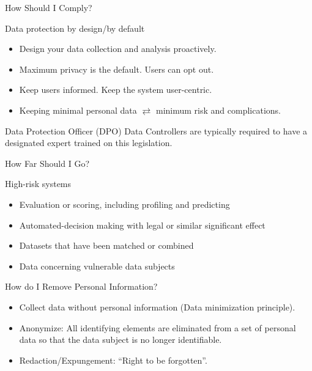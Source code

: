 \documentclass[24pt]{beamer}
\begin{document}
\begin{frame}{How Should I Comply?}
	\begin{block}{Data protection by design/by default}
		\begin{itemize}
			\item Design your data collection and analysis \alert{proactively}.
			\item Maximum privacy is the default. Users can opt out.
			\item Keep users informed. Keep the system user-centric.
			\item Keeping \alert{minimal personal data} $\rightleftarrows$ minimum risk and complications.
		\end{itemize}
	\end{block}
	
	\begin{block}{Data Protection Officer (DPO)}
		Data Controllers are typically required to have a \alert{designated expert} trained on this legislation.
	\end{block}
\end{frame}

\begin{frame}{How Far Should I Go?}
	\begin{alertblock}{High-risk systems}
		\begin{itemize}
			\item Evaluation or scoring, including profiling and predicting
			\item Automated-decision making with legal or similar significant effect
			\item Datasets that have been matched or combined
			\item Data concerning vulnerable data subjects
		\end{itemize}
	\end{alertblock}
\end{frame}

\begin{frame}{How do I Remove Personal Information?}
	\begin{itemize}
		\item Collect data without personal information (Data minimization principle).
		\item Anonymize: All identifying elements are eliminated from a set of personal data so that the data subject is no longer identifiable.
		\item Redaction/Expungement: ``Right to be forgotten''.
	\end{itemize}
\end{frame}
\end{document}
